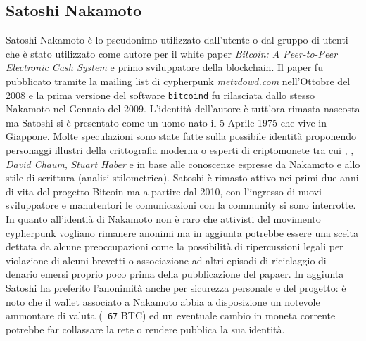 \appendix
\begin{appendices}
    \chapter{Satoshi Nakamoto}\label{app:satoshi}
    Satoshi Nakamoto è lo pseudonimo utilizzato dall'utente o dal gruppo di utenti che è stato utilizzato come autore per il white paper \textit{Bitcoin: A Peer-to-Peer Electronic Cash System} e primo sviluppatore della blockchain.\newline
    Il paper fu pubblicato tramite la mailing list di cypherpunk \textit{metzdowd.com} nell'Ottobre del 2008 e la prima versione del software \texttt{bitcoind} fu rilasciata dallo stesso Nakamoto nel Gennaio del 2009.\newline
    L'identità dell'autore è tutt'ora rimasta nascosta ma Satoshi si è presentato come un uomo nato il 5 Aprile 1975 che vive in Giappone. Molte speculazioni sono state fatte sulla possibile identità proponendo personaggi illustri della crittografia moderna o esperti di criptomonete tra cui , , \textit{David Chaum}, \textit{Stuart Haber} e  in base alle conoscenze espresse da Nakamoto e allo stile di scrittura (analisi stilometrica).\newline
    Satoshi è rimasto attivo nei primi due anni di vita del progetto Bitcoin ma a partire dal 2010, con l'ingresso di nuovi sviluppatore e manutentori le comunicazioni con la community si sono interrotte.\newline
    In quanto all'identià di Nakamoto non è raro che attivisti del movimento cypherpunk vogliano rimanere anonimi ma in aggiunta potrebbe essere una scelta dettata da alcune preoccupazioni come la possibilità di ripercussioni legali per violazione di alcuni brevetti o associazione ad altri episodi di riciclaggio di denario emersi proprio poco prima della pubblicazione del papaer.\newline
    In aggiunta Satoshi ha preferito l'anonimità anche per sicurezza personale e del progetto: è noto che il wallet associato a Nakamoto abbia a disposizione un notevole ammontare di valuta (\texttt{~67} BTC) ed un eventuale cambio in moneta corrente potrebbe far collassare la rete o rendere pubblica la sua identità.
\end{appendices}

